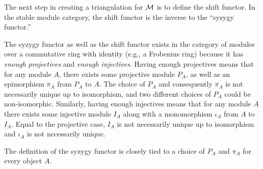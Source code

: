 The next step in creating a triangulation for \( {\mathcal{M}} \) is to define the shift functor. In the stable module category, the shift functor is the inverse to the ``syzygy functor.''

The syzygy functor as well as the shift functor exists in the category of modules over a commutative ring with identity (e.g., a Frobenius ring) because it has \emph{enough projectives} and \emph{enough injectives}. Having enough projectives means that for any module \( A \), there exists some projective module \( P_A \), as well as an epimorphism \( \pi_A \) from \( P_A \) to \( A \). The choice of \( P_A \) and consequently \( \pi_A \) is not necessarily unique up to isomorphism, and two different choices of \( P_A \) could be non-isomorphic. Similarly, having enough injectives means that for any module \( A \) there exists some injective module \( I_A \) along with a monomorphism \( \iota_A \) from \( A \) to \( I_A \). Equal to the projective case, \( I_A \) is not necessarily unique up to isomorphism and \( \iota_A \) is not necessarily unique.

The definition of the syzygy functor is closely tied to a choice of \( P_A \) and \( \pi_A \) for every object \( A \).

